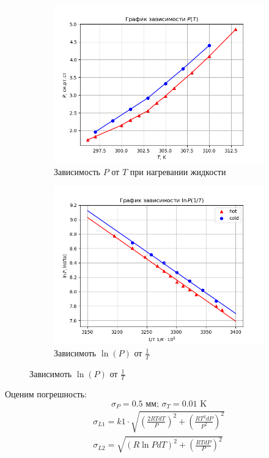 \begin{figure}[h!]
    \centering
    \begin{subfigure}[t]{0.45\textwidth}
        \includegraphics[width=10cm]{simpleplot.png}
        \caption{Зависимость $P$ от $T$ при нагревании жидкости}
    \end{subfigure}
    \hfill
    \begin{subfigure}[t]{0.45\textwidth}
        \includegraphics[width=10cm]{complexplot.png}
        \caption{Зависимоть $\ln(P)$ от $\frac{1}{T}$}
    \end{subfigure}
    \label{fig:plots}
\end{figure}

\newpage\indent
Оценим погрешность:
$$\sigma_{P} = 0.5\text{ мм; }\sigma_{T} = 0.01 \text{ K}$$ 
\begin{align}
    \sigma_{L1} = k1 \cdot \sqrt{{\left (\frac{2 R T dT}{P}\right ) }^2 + {\left ( \frac{R T^2 dP}{P^2}\right )}^2} \\[6pt]
    \sigma_{L2} = \sqrt{(R \ln{P} dT)^2 + {\left ( \frac{R T dP}{P}\right )}^2}
\end{align}


